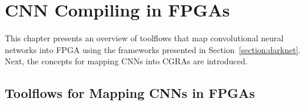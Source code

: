 \chapter{CNN Compiling in FPGAs}
\label{chapter:CNNVersat}

This chapter presents an overview of toolflows that map convolutional neural
networks into FPGA using the frameworks presented in
Section~\ref{section:darknet}. Next, the concepts for mapping CNNs
into CGRAs are introduced.

%

\section{Toolflows for Mapping CNNs in FPGAs}
\label{section:toolflow}

